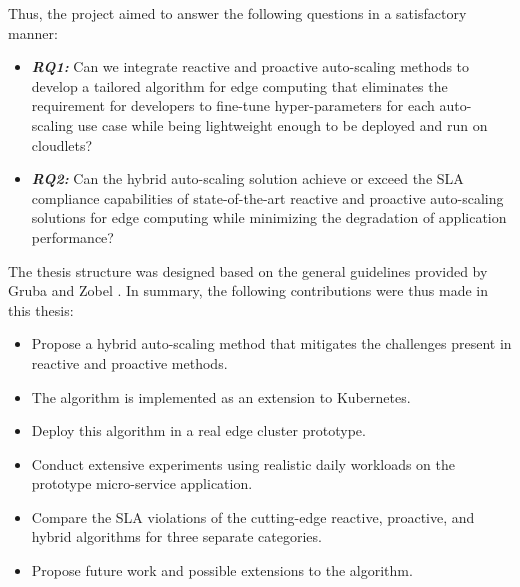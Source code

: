 Thus, the project aimed to answer the following questions in a satisfactory manner:
\begin{itemize}
    \item \textbf{\textit{RQ1:}} Can we integrate reactive and proactive auto-scaling methods to develop a tailored algorithm for edge computing that eliminates the requirement for developers to fine-tune hyper-parameters for each auto-scaling use case while being lightweight enough to be deployed and run on cloudlets?
    \item \textbf{\textit{RQ2:}} Can the hybrid auto-scaling solution achieve or exceed the SLA compliance capabilities of state-of-the-art reactive and proactive auto-scaling solutions for edge computing while minimizing the degradation of application performance?
\end{itemize}

The thesis structure was designed based on the general guidelines provided by Gruba and Zobel \cite{gruba2017write}. In summary, the following contributions were thus made in this thesis:

\begin{itemize}
    \item Propose a hybrid auto-scaling method that mitigates the challenges present in reactive and proactive methods.
    \item The algorithm is implemented as an extension to Kubernetes.
    \item Deploy this algorithm in a real edge cluster prototype.
    \item Conduct extensive experiments using realistic daily workloads on the prototype micro-service application.
    \item Compare the SLA violations of the cutting-edge reactive, proactive, and hybrid algorithms for three separate categories.
    \item Propose future work and possible extensions to the algorithm.
\end{itemize}
